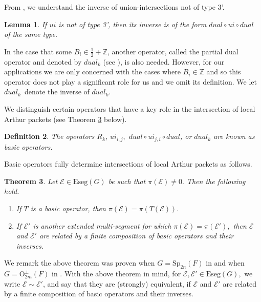 \documentclass[11pt,letterpaper]{amsart}
\newcommand{\Eseg}{{\mathrm{Eseg}}}
\newcommand{\OO}{\mathrm{O}}
\newcommand{\Sp}{\mathrm{Sp}}
\newcommand{\EE}{\mathcal{E}}
\newtheorem{thm}{Theorem}[section]
\newtheorem{lemma}[thm]{Lemma}
\newtheorem{defn}[thm]{Definition}
\numberwithin{equation}{section}
\begin{document}
From \cite{HLL22, HLL25}, we understand the inverse of union-intersections not of type 3'.

\begin{lemma}\label{lemma ui inv = dud}
   If $ui$ is not of type 3', then its inverse is of the form $dual\circ ui\circ dual$ of the same type. 
\end{lemma}


In the case that some $B_i\in\frac{1}{2}+\mathbb{Z}$, another operator, called the partial dual operator and denoted by $dual_k$ (see \cite[Definition 6.5]{HLL22}), is also needed. However, for our applications we are only concerned with the cases where $B_i\in\mathbb{Z}$ and so this operator does not play a significant role for us and we omit its definition. We let $dual_k^-$ denote the inverse of $dual_k$.


We distinguish certain operators that have a key role in the intersection of local Arthur packets (see Theorem \ref{thm intersections of local Arthur packets} below).

\begin{defn}\label{def basic operators}
    The operators $R_k$, $ui_{i,j},$ $dual\circ ui_{j,i}\circ dual$, or $dual_k$ are known as \emph{basic operators}.
\end{defn}

Basic operators fully determine intersections of local Arthur packets as follows.

\begin{thm}\label{thm intersections of local Arthur packets}
    Let $\EE\in\Eseg(G)$ be such that $\pi(\EE)\neq 0.$ Then the following hold.
    \begin{enumerate}
        \item If $T$ is a basic operator, then $\pi(\EE)=\pi(T(\EE)).$
        \item If $\EE'$ is another extended multi-segment for which $\pi(\EE)=\pi(\EE'),$ then $\EE$ and $\EE'$ are related by a finite composition of basic operators and their inverses.
    \end{enumerate}
\end{thm}

We remark the above theorem was proven when $G=\Sp_{2n}(F)$ in \cite[Theorem 1.4]{HLL22} and when $G=\OO_{2m}^\pm(F)$ in \cite[Theorems 6.13 and 6.15]{HLL25}. With the above theorem in mind, for $\EE,\EE'\in\Eseg(G),$ we write $\EE\sim\EE'$, and say that they are (strongly) equivalent, if $\EE$ and $\EE'$ are related by a finite composition of basic operators and their inverses.
\end{document}
